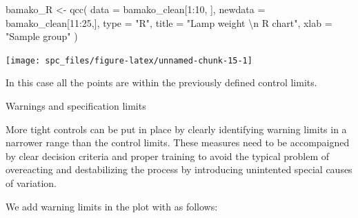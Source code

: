 \documentclass[
]{book}
\newenvironment{Shaded}{\begin{snugshade}}{\end{snugshade}}
\newcommand{\AttributeTok}[1]{\textcolor[rgb]{0.77,0.63,0.00}{#1}}
\newcommand{\ConstantTok}[1]{\textcolor[rgb]{0.00,0.00,0.00}{#1}}
\newcommand{\DecValTok}[1]{\textcolor[rgb]{0.00,0.00,0.81}{#1}}
\newcommand{\FunctionTok}[1]{\textcolor[rgb]{0.00,0.00,0.00}{#1}}
\newcommand{\NormalTok}[1]{#1}
\newcommand{\OtherTok}[1]{\textcolor[rgb]{0.56,0.35,0.01}{#1}}
\newcommand{\SpecialCharTok}[1]{\textcolor[rgb]{0.00,0.00,0.00}{#1}}
\newcommand{\StringTok}[1]{\textcolor[rgb]{0.31,0.60,0.02}{#1}}
\begin{document}
\begin{Shaded}
\begin{Highlighting}[]
\NormalTok{bamako\_R }\OtherTok{\textless{}{-}} \FunctionTok{qcc}\NormalTok{(}
  \AttributeTok{data =}\NormalTok{ bamako\_clean[}\DecValTok{1}\SpecialCharTok{:}\DecValTok{10}\NormalTok{, ],}
  \AttributeTok{newdata =}\NormalTok{ bamako\_clean[}\DecValTok{11}\SpecialCharTok{:}\DecValTok{25}\NormalTok{,], }
  \AttributeTok{type =} \StringTok{"R"}\NormalTok{, }
  \AttributeTok{title =} \StringTok{"Lamp weight }\SpecialCharTok{\textbackslash{}n}\StringTok{ R chart"}\NormalTok{,}
  \AttributeTok{xlab =} \StringTok{"Sample group"}
\NormalTok{  )}
\end{Highlighting}
\end{Shaded}

\texttt{[image: spc\_files/figure-latex/unnamed-chunk-15-1]}

In this case all the points are within the previously defined control limits.

Warnings and specification limits

More tight controls can be put in place by clearly identifying warning limits in a narrower range than the control limits. These measures need to be accompaigned by clear decision criteria and proper training to avoid the typical problem of overeacting and destabilizing the process by introducing unintented special causes of variation.

We add warning limits in the plot with as follows:

\begin{Shaded}
\end{Shaded}
\end{document}
